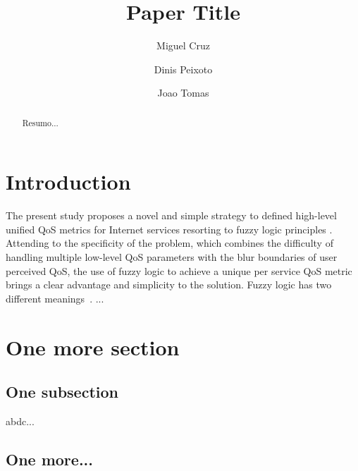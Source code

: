 \documentclass{llncs}
\begin{document}
\mainmatter
\title{Paper Title}


\author{Miguel Cruz \and Dinis Peixoto \and Joao Tomas}



\date{}


\maketitle
\begin{abstract}
Resumo...
\end{abstract}

\section{Introduction}

 The present study proposes a novel and simple strategy to defined high-level unified QoS metrics for Internet services resorting to fuzzy logic principles \cite{Zadeh65}. 
 Attending to the specificity of the problem, which combines the difficulty of handling multiple low-level QoS parameters with the blur boundaries of user perceived QoS, the use of fuzzy logic to achieve a unique per service QoS metric brings a clear advantage and simplicity to the solution.
Fuzzy logic has two different meanings~\cite{Nguyen99}. ...

\section{One more section}

\subsection{One subsection}
abdc...
\subsection{One more...}

\end{document}
